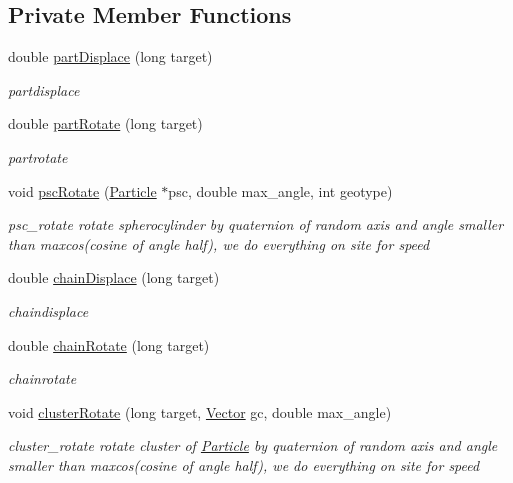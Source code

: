 \subsection*{Private Member Functions}
\begin{DoxyCompactItemize}
\item 
double \hyperlink{class_move_creator_a1c5308ced311a2cb0fe017339001961b}{part\+Displace} (long target)
\begin{DoxyCompactList}\small\item\em partdisplace \end{DoxyCompactList}\item 
double \hyperlink{class_move_creator_a5f9b0220aea7a9cc6de6e4f15f7756b9}{part\+Rotate} (long target)
\begin{DoxyCompactList}\small\item\em partrotate \end{DoxyCompactList}\item 
void \hyperlink{class_move_creator_aefca1017d6f0fd44dd580b6993573724}{psc\+Rotate} (\hyperlink{class_particle}{Particle} $\ast$psc, double max\+\_\+angle, int geotype)
\begin{DoxyCompactList}\small\item\em psc\+\_\+rotate rotate spherocylinder by quaternion of random axis and angle smaller than maxcos(cosine of angle half), we do everything on site for speed \end{DoxyCompactList}\item 
double \hyperlink{class_move_creator_aa1a4e9d3c62f875fb363bba9e3afdd88}{chain\+Displace} (long target)
\begin{DoxyCompactList}\small\item\em chaindisplace \end{DoxyCompactList}\item 
double \hyperlink{class_move_creator_ad736e50169f0d72a05ae5b19a180bb15}{chain\+Rotate} (long target)
\begin{DoxyCompactList}\small\item\em chainrotate \end{DoxyCompactList}\item 
void \hyperlink{class_move_creator_a1508c21b5cc769d52ddd8de79b97960d}{cluster\+Rotate} (long target, \hyperlink{class_vector}{Vector} gc, double max\+\_\+angle)
\begin{DoxyCompactList}\small\item\em cluster\+\_\+rotate rotate cluster of \hyperlink{class_particle}{Particle} by quaternion of random axis and angle smaller than maxcos(cosine of angle half), we do everything on site for speed \end{DoxyCompactList}\item 

\end{DoxyCompactItemize}
